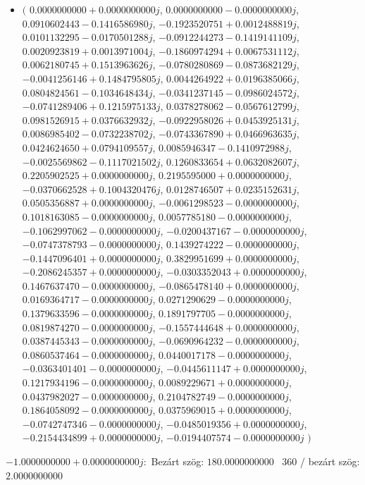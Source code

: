 \documentclass[14pt,a4paper]{article}
\begin{document}
\begin{itemize}
\item
$\big($
$0.0000000000+0.0000000000j$, $0.0000000000-0.0000000000j$, $0.0910602443-0.1416586980j$, $-0.1923520751+0.0012488819j$, $0.0101132295-0.0170501288j$, $-0.0912244273-0.1419141109j$, $0.0020923819+0.0013971004j$, $-0.1860974294+0.0067531112j$, $0.0062180745+0.1513963626j$, $-0.0780280869-0.0873682129j$, $-0.0041256146+0.1484795805j$, $0.0044264922+0.0196385066j$, $0.0804824561-0.1034648434j$, $-0.0341237145-0.0986024572j$, $-0.0741289406+0.1215975133j$, $0.0378278062-0.0567612799j$, $0.0981526915+0.0376632932j$, $-0.0922958026+0.0453925131j$, $0.0086985402-0.0732238702j$, $-0.0743367890+0.0466963635j$, $0.0424624650+0.0794109557j$, $0.0085946347-0.1410972988j$, $-0.0025569862-0.1117021502j$, $0.1260833654+0.0632082607j$, $0.2205902525+0.0000000000j$, $0.2195595000+0.0000000000j$, $-0.0370662528+0.1004320476j$, $0.0128746507+0.0235152631j$, $0.0505356887+0.0000000000j$, $-0.0061298523-0.0000000000j$, $0.1018163085-0.0000000000j$, $0.0057785180-0.0000000000j$, $-0.1062997062-0.0000000000j$, $-0.0200437167-0.0000000000j$, $-0.0747378793-0.0000000000j$, $0.1439274222-0.0000000000j$, $-0.1447096401+0.0000000000j$, $0.3829951699+0.0000000000j$, $-0.2086245357+0.0000000000j$, $-0.0303352043+0.0000000000j$, $0.1467637470-0.0000000000j$, $-0.0865478140+0.0000000000j$, $0.0169364717-0.0000000000j$, $0.0271290629-0.0000000000j$, $0.1379633596-0.0000000000j$, $0.1891797705-0.0000000000j$, $0.0819874270-0.0000000000j$, $-0.1557444648+0.0000000000j$, $0.0387445343-0.0000000000j$, $-0.0690964232-0.0000000000j$, $0.0860537464-0.0000000000j$, $0.0440017178-0.0000000000j$, $-0.0363401401-0.0000000000j$, $-0.0445611147+0.0000000000j$, $0.1217934196-0.0000000000j$, $0.0089229671+0.0000000000j$, $0.0437982027-0.0000000000j$, $0.2104782749-0.0000000000j$, $0.1864058092-0.0000000000j$, $0.0375969015+0.0000000000j$, $-0.0742747346-0.0000000000j$, $-0.0485019356+0.0000000000j$, $-0.2154434899+0.0000000000j$, $-0.0194407574-0.0000000000j$
$\big)$
\end{itemize}
$-1.0000000000+0.0000000000j$:\
Bezárt szög: $180.0000000000$ \
360 / bezárt szög: $2.0000000000$\
\end{document}
